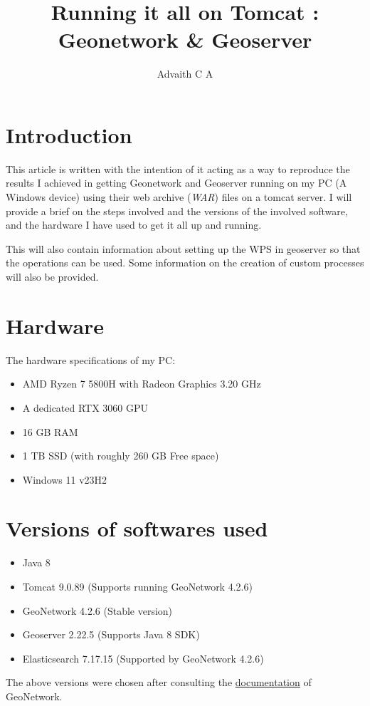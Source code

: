 \documentclass{article}
\title{Running it all on Tomcat : \\ Geonetwork \& Geoserver}
\author{Advaith C A}
\begin{document}
    \maketitle
    \section*{Introduction}
        \hspace{1.5em}This article is written with the intention of it acting as a way to reproduce the results I achieved in getting Geonetwork and Geoserver running on my PC (A Windows device) using their web archive (\textit{WAR}) files on a tomcat server. I will provide a brief on the steps involved and the versions of the involved software, and the hardware I have used to get it all up and running. \par
        \hspace{1.5em}This will also contain information about setting up the WPS in geoserver so that the operations can be used. Some information on the creation of custom processes will also be provided.
    \section*{Hardware}
        \hspace{1.5em}The hardware specifications of my PC:
        \begin{itemize}
            \item AMD Ryzen 7 5800H with Radeon Graphics 3.20 GHz
            \item A dedicated RTX 3060 GPU
            \item 16 GB RAM
            \item 1 TB SSD (with roughly 260 GB Free space)
            \item Windows 11 v23H2
        \end{itemize}
    \section*{Versions of softwares used}
    \begin{itemize}
        \item Java 8
        \item Tomcat 9.0.89 (Supports running GeoNetwork 4.2.6)
        \item GeoNetwork 4.2.6 (Stable version)
        \item Geoserver 2.22.5 (Supports Java 8 SDK)
        \item Elasticsearch 7.17.15 (Supported by GeoNetwork 4.2.6)
    \end{itemize}
        \hspace{1.5em}The above versions were chosen after consulting the \href{https://docs.geonetwork-opensource.org\-/4.2/install-guide/}{documentation} of GeoNetwork.
\end{document}
